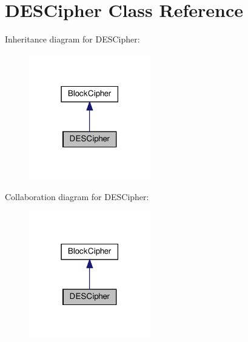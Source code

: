 \hypertarget{classDESCipher}{}\section{D\+E\+S\+Cipher Class Reference}
\label{classDESCipher}


Inheritance diagram for D\+E\+S\+Cipher\+:
\nopagebreak
\begin{figure}[H]
\begin{center}
\leavevmode
\includegraphics[width=150pt]{classDESCipher__inherit__graph}
\end{center}
\end{figure}


Collaboration diagram for D\+E\+S\+Cipher\+:
\nopagebreak
\begin{figure}[H]
\begin{center}
\leavevmode
\includegraphics[width=150pt]{classDESCipher__coll__graph}
\end{center}
\end{figure}
